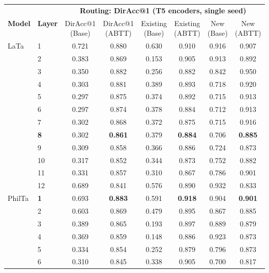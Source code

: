 \begin{table}[t]
\centering
\scriptsize
\setlength{\tabcolsep}{3pt}
\begin{tabular}{llcccccc}
\toprule
\multicolumn{2}{c}{} & \multicolumn{6}{c}{\textbf{Routing: DirAcc@1 (T5 encoders, single seed)}} \\
\cmidrule(lr){3-8}
\textbf{Model} & \textbf{Layer} & \makecell{DirAcc@1\\(Base)} & \makecell{DirAcc@1\\(ABTT)} & \makecell{Existing\\(Base)} & \makecell{Existing\\(ABTT)} & \makecell{New\\(Base)} & \makecell{New\\(ABTT)} \\
\midrule
LaTa & 1 & 0.721 & 0.880 & 0.630 & 0.910 & 0.916 & 0.907 \\
 & 2 & 0.383 & 0.869 & 0.153 & 0.905 & 0.913 & 0.892 \\
 & 3 & 0.350 & 0.882 & 0.256 & 0.882 & 0.842 & 0.950 \\
 & 4 & 0.303 & 0.881 & 0.389 & 0.893 & 0.718 & 0.920 \\
 & 5 & 0.297 & 0.875 & 0.374 & 0.892 & 0.715 & 0.913 \\
 & 6 & 0.297 & 0.874 & 0.378 & 0.884 & 0.712 & 0.913 \\
 & 7 & 0.302 & 0.868 & 0.372 & 0.875 & 0.715 & 0.916 \\
 & \textbf{8} & 0.302 & \textbf{0.861} & 0.379 & \textbf{0.884} & 0.706 & \textbf{0.885} \\
 & 9 & 0.309 & 0.858 & 0.366 & 0.886 & 0.724 & 0.873 \\
 & 10 & 0.317 & 0.852 & 0.344 & 0.873 & 0.752 & 0.882 \\
 & 11 & 0.331 & 0.857 & 0.310 & 0.867 & 0.786 & 0.901 \\
 & 12 & 0.689 & 0.841 & 0.576 & 0.890 & 0.932 & 0.833 \\
\midrule
PhilTa & \textbf{1} & 0.693 & \textbf{0.883} & 0.591 & \textbf{0.918} & 0.904 & \textbf{0.901} \\
 & 2 & 0.603 & 0.869 & 0.479 & 0.895 & 0.867 & 0.885 \\
 & 3 & 0.389 & 0.865 & 0.193 & 0.897 & 0.889 & 0.879 \\
 & 4 & 0.369 & 0.859 & 0.148 & 0.886 & 0.923 & 0.873 \\
 & 5 & 0.334 & 0.854 & 0.252 & 0.879 & 0.796 & 0.873 \\
 & 6 & 0.310 & 0.845 & 0.338 & 0.905 & 0.700 & 0.817 \\

\end{tabular}
\end{table}

